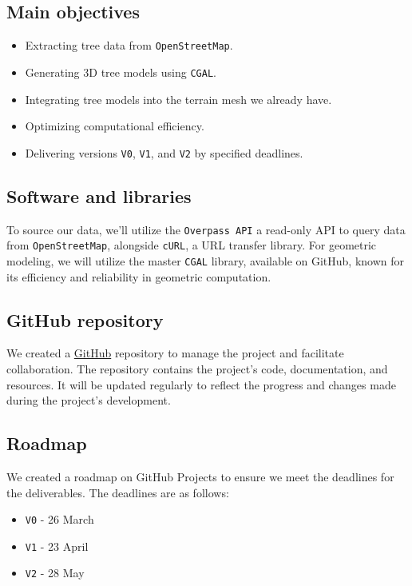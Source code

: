 \documentclass[12pt]{article}
\begin{document}
\subsection{Main objectives}

\begin{itemize}
    \item Extracting tree data from \texttt{OpenStreetMap}.
    \item Generating 3D tree models using \texttt{CGAL}.
    \item Integrating tree models into the terrain mesh we already have.
    \item Optimizing computational efficiency.
    \item Delivering versions \texttt{V0}, \texttt{V1}, and \texttt{V2} by specified deadlines.
\end{itemize}

\subsection{Software and libraries}
To source our data, we'll utilize the \texttt{Overpass API}\cite{overpass} a
read-only API to query data from \texttt{OpenStreetMap}, alongside
\texttt{cURL}\cite{curl}, a URL transfer library. For geometric modeling, we
will utilize the master \texttt{CGAL} library, available on
GitHub\cite{cgal-master}, known for its efficiency and reliability in geometric
computation.

\subsection{GitHub repository}
We created a \href{https://github.com/master-csmi/2024-m1-vegetation}{GitHub}
repository to manage the project and facilitate collaboration.
The repository contains the project's code, documentation, and resources.
It will be updated regularly to reflect the progress and changes made during
the project's development.

\subsection{Roadmap}
We created a roadmap on GitHub Projects to ensure we meet the deadlines for the
deliverables.
The deadlines are as follows:

\begin{itemize}
    \item \texttt{V0} - 26 March
    \item \texttt{V1} - 23 April
    \item \texttt{V2} - 28 May
\end{itemize}
\end{document}
